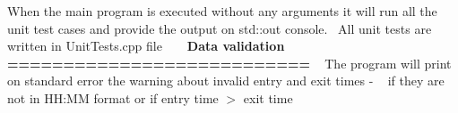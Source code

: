 When the main program is executed without any arguments it will run all the unit test cases and provide the output on std\+::out console.~\newline
All unit tests are written in Unit\+Tests.\+cpp file ~\newline
~\newline
{\bfseries{Data validation ===========================}} ~\newline
The program will print on standard error the warning about invalid entry and exit times -\/ ~\newline
if they are not in HH\+:MM format or if entry time \texorpdfstring{$>$}{>} exit time 